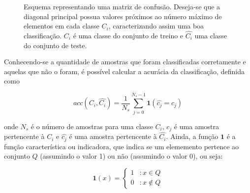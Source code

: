 \begin{figure}[ht!]
\begin{center}
\caption{\label{fig:confusa} Esquema representando uma matriz de
  confusão. Deseja-se que a diagonal principal possua valores próximos
  ao número máximo de elementos em cada classe $C_i$, caracterizando
  assim uma boa classificação. $C_i$ é uma classe do conjunto de
  treino e $\hat{C_i}$ uma classe do conjunto de teste.}
\fonteminha
\end{center}
\end{figure}

Conhecendo-se a quantidade de amostras que foram classificadas corretamente e aquelas que não o foram, é possível calcular a acurácia da classificação, definida como

\begin{equation}
  acc(C_i, \hat{C_i}) = \frac{1}{N_s} \sum_{j=0}^{N_s-1} \textbf{1}(\hat{c_j} = c_j)
\end{equation}

\noindent onde $N_s$ é o número de amostras para uma classe $C_i$,
$c_j$ é uma amostra pertencente à $C_i$ e $\hat{c_j}$ é uma amostra
pertencente à $\hat{C_i}$. Ainda, a função $\textbf{1}$ é a função
característica ou indicadora, que indica se um elememento pertence ao
conjunto $Q$ (assumindo o valor 1) ou não (assumindo o valor 0), ou
seja:

\begin{equation}
  \textbf{1}(x) = \left\{
     \begin{array}{lr}
       1 & : x \in Q \\
       0 & : x \notin Q
     \end{array}
   \right.
\end{equation}

